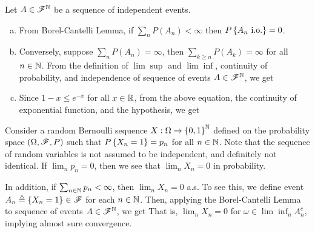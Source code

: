 \documentclass[12pt,aspectratio=169]{beamer}
\begin{document}
\begin{frame}
\begin{Proof} 
Let $A \in \mathscr{F}^{\mathbb{N}}$ be a sequence of independent events. 
\begin{enumerate}[(a)]
\item<2-> From Borel-Cantelli Lemma, if $\sum_nP(A_n) < \infty$ then $P\left\{A_n\text{ i.o.}\right\} = 0$. 
\item<3-> Conversely, suppose $\sum_nP(A_n) = \infty$, 
then $\sum_{k \ge n}P(A_k) = \infty$ for all $n \in \mathbb{N}$.  
From the definition of $\lim\sup$ and $\lim\inf$, continuity of probability, 
and independence of sequence of events $A \in \mathscr{F}^{\mathbb{N}}$, we get  
\item <4-> Since $1-x \le e^{-x}$ for all $x \in \mathbb{R}$, from the above equation, the continuity of exponential function, and the hypothesis, we get 
\end{enumerate}
\end{Proof}
\end{frame}


\begin{frame}


\begin{Example} 
Consider a random Bernoulli sequence $X: \Omega \to \left\{0,1\right\}^{\mathbb{N}}$ defined on the probability space $(\Omega, \mathscr{F}, P)$ such that $P\left\{X_n = 1\right\} = p_n$ for all $n \in \mathbb{N}$. 
Note that the sequence of random variables is not assumed to be independent, and definitely not identical. 
If $\lim_np_n = 0$, then we see that $\lim_nX_n = 0$ in probability. 

In addition, if $\sum_{n\in \mathbb{N}}p_n <\infty$, then $\lim_nX_n = 0$ a.s. 
To see this, we define event $A_n \triangleq \left\{X_n = 1\right\} \in \mathscr{F}$ for each $n \in \mathbb{N}$. 
Then, applying the Borel-Cantelli Lemma to sequence of events $A \in \mathscr{F}^{\mathbb{N}}$, 
we get  
That is, $\lim_nX_n = 0$ for $\omega \in \lim\inf_nA_n^c$, implying almost sure convergence. 
\end{Example}
\end{frame}
\end{document}
